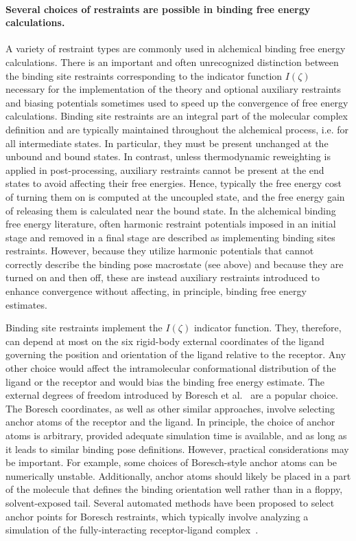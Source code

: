 \documentclass[9pt,bestpractices]{livecoms}
\begin{document}
\paragraph{Several choices of restraints are possible in binding free energy calculations.}
A variety of restraint types are commonly used in alchemical binding free energy calculations. There is an important and often unrecognized distinction between the binding site restraints corresponding to the indicator function $I(\zeta)$ necessary for the implementation of the theory and optional auxiliary restraints and biasing potentials sometimes used to speed up the convergence of free energy calculations. Binding site restraints are an integral part of the molecular complex definition and are typically maintained throughout the alchemical process, i.e. for all intermediate states. In particular, they must be present unchanged at the unbound and bound states. In contrast, unless thermodynamic reweighting is applied in post-processing, auxiliary restraints cannot be present at the end states to avoid affecting their free energies. Hence, typically the free energy cost of turning them on is computed at the uncoupled state, and the free energy gain of releasing them is calculated near the bound state. In the alchemical binding free energy literature, often harmonic restraint potentials imposed in an initial stage and removed in a final stage are described as implementing binding sites restraints. However, because they utilize harmonic potentials that cannot correctly describe the binding pose macrostate (see above) and because they are turned on and then off, these are instead auxiliary restraints introduced to enhance convergence without affecting, in principle, binding free energy estimates.

Binding site restraints implement the $I(\zeta)$ indicator function. They, therefore, can depend at most on the six rigid-body external coordinates of the ligand governing the position and orientation of the ligand relative to the receptor. Any other choice would affect the intramolecular conformational distribution of the ligand or the receptor and would  bias the binding free energy estimate. The external degrees of freedom introduced by Boresch et al.~\cite{boresch2003absolute,leitgeb2005alchemical} are a popular choice. The Boresch coordinates, as well as other similar approaches, involve selecting anchor atoms of the receptor and the ligand. In principle, the choice of anchor atoms is arbitrary, provided adequate simulation time is available, and as long as it leads to similar binding pose definitions. However, practical considerations may be important. For example, some choices of Boresch-style anchor atoms can be numerically unstable. Additionally, anchor atoms should likely be placed in a part of the molecule that defines the binding orientation well rather than in a floppy, solvent-exposed tail. Several automated methods have been proposed to select anchor points for Boresch restraints, which typically involve analyzing a simulation of the fully-interacting receptor-ligand complex~\cite{alibay2022evaluating, alibay2021ialibay, baumann2023broadening, chen2023enhancing, hedges2023suite, wu2025optimizing}.
\end{document}
